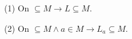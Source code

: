 (1) On $\subseteq M \rightarrow L \subseteq M$.

(2) On $\subseteq M \wedge a \in M \rightarrow L_a \subseteq M$.
